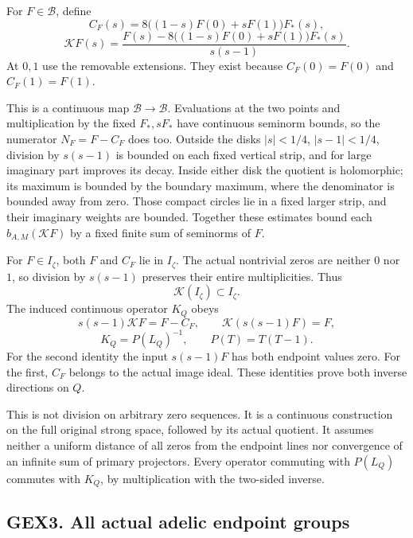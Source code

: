 For \(F\in\mathcal B\), define \[
C_F(s)=8\big((1-s)F(0)+sF(1)\big)F_*(s),
\] \[
\mathcal KF(s)=
\frac{F(s)-8\big((1-s)F(0)+sF(1)\big)F_*(s)}
{s(s-1)}.
\tag{GEX2.3}
\] At \(0,1\) use the removable extensions. They exist because
\(C_F(0)=F(0)\) and \(C_F(1)=F(1)\).

This is a continuous map \(\mathcal B\to\mathcal B\). Evaluations at the
two points and multiplication by the fixed \(F_*,sF_*\) have continuous
seminorm bounds, so the numerator \(N_F=F-C_F\) does too. Outside the
disks \(|s|<1/4\), \(|s-1|<1/4\), division by \(s(s-1)\) is bounded on
each fixed vertical strip, and for large imaginary part improves its
decay. Inside either disk the quotient is holomorphic; its maximum is
bounded by the boundary maximum, where the denominator is bounded away
from zero. Those compact circles lie in a fixed larger strip, and their
imaginary weights are bounded. Together these estimates bound each
\(b_{A,M}(\mathcal KF)\) by a fixed finite sum of seminorms of \(F\).

For \(F\in I_\zeta\), both \(F\) and \(C_F\) lie in \(I_\zeta\). The
actual nontrivial zeros are neither \(0\) nor \(1\), so division by
\(s(s-1)\) preserves their entire multiplicities. Thus \[
\mathcal K(I_\zeta)\subset I_\zeta.
\tag{GEX2.4}
\] The induced continuous operator \(K_Q\) obeys \[
s(s-1)\mathcal KF=F-C_F,\qquad
\mathcal K(s(s-1)F)=F,
\] \[
\boxed{K_Q=P(L_Q)^{-1},\qquad P(T)=T(T-1).}
\tag{GEX2.5}
\] For the second identity the input \(s(s-1)F\) has both endpoint
values zero. For the first, \(C_F\) belongs to the actual image ideal.
These identities prove both inverse directions on \(Q\).

This is not division on arbitrary zero sequences. It is a continuous
construction on the full original strong space, followed by its actual
quotient. It assumes neither a uniform distance of all zeros from the
endpoint lines nor convergence of an infinite sum of primary projectors.
Every operator commuting with \(P(L_Q)\) commutes with \(K_Q\), by
multiplication with the two-sided inverse.

\subsection{GEX3. All actual adelic endpoint
groups}\label{gex3.-all-actual-adelic-endpoint-groups}


